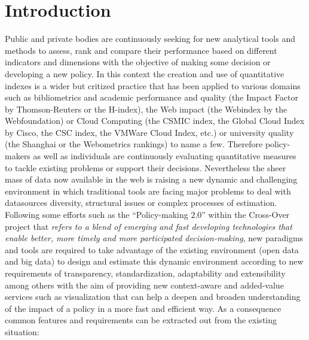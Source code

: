 \documentclass{llncs}
\begin{document}
\section{Introduction}
Public and private bodies are continuously seeking for new analytical tools and methods to assess, rank and compare their performance based 
on different indicators and dimensions with the objective of making some decision or developing a new policy. 
In this context the creation and use of quantitative indexes is a wider but critized practice that has been applied to various 
domains such as bibliometrics and academic performance and quality (the Impact Factor by Thomson-Reuters or the H-index), 
the Web impact (the Webindex by the Webfoundation) or Cloud Computing (the CSMIC index, the Global Cloud Index by Cisco, the CSC index, 
the VMWare Cloud Index, etc.) or university quality (the Shanghai or the Webometrics rankings) to name a few. 
Therefore policy-makers as well as individuals are continuously evaluating quantitative measures to tackle 
existing problems or support their decisions. Nevertheless the sheer mass of data now available in the web is 
raising a new dynamic and challenging environment in which traditional tools are facing major 
problems to deal with datasources diversity, structural issues or complex processes of estimation. Following some efforts 
such as the ``Policy-making $2.0$'' within the Cross-Over project that \textit{refers to a blend of emerging and fast developing technologies 
that enable better, more timely and more participated decision-making}, new paradigms and tools are required to take advantage of 
the existing environment (open data and big data) to design and estimate this dynamic environment according to new requirements of 
transparency, standardization, adaptability and extensibility among others with the aim of providing new context-aware 
and added-value services such as visualization that can help a deepen and broaden understanding of the impact of a 
policy in a more fast and efficient way. As a consequence common features and requirements can be extracted out from the existing situation:
\end{document}
